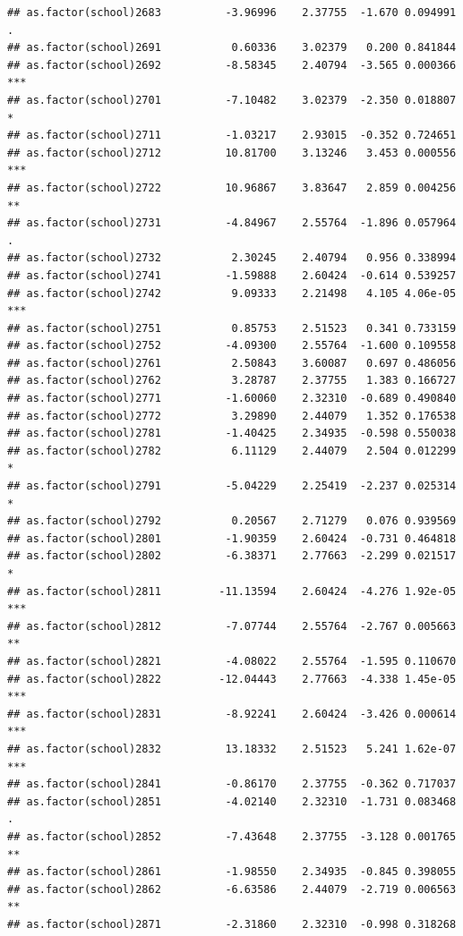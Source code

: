 \documentclass[ignorenonframetext,]{beamer}
\begin{document}
\begin{frame}[fragile]{}
\begin{verbatim}
## as.factor(school)2683          -3.96996    2.37755  -1.670 0.094991 .  
## as.factor(school)2691           0.60336    3.02379   0.200 0.841844    
## as.factor(school)2692          -8.58345    2.40794  -3.565 0.000366 ***
## as.factor(school)2701          -7.10482    3.02379  -2.350 0.018807 *  
## as.factor(school)2711          -1.03217    2.93015  -0.352 0.724651    
## as.factor(school)2712          10.81700    3.13246   3.453 0.000556 ***
## as.factor(school)2722          10.96867    3.83647   2.859 0.004256 ** 
## as.factor(school)2731          -4.84967    2.55764  -1.896 0.057964 .  
## as.factor(school)2732           2.30245    2.40794   0.956 0.338994    
## as.factor(school)2741          -1.59888    2.60424  -0.614 0.539257    
## as.factor(school)2742           9.09333    2.21498   4.105 4.06e-05 ***
## as.factor(school)2751           0.85753    2.51523   0.341 0.733159    
## as.factor(school)2752          -4.09300    2.55764  -1.600 0.109558    
## as.factor(school)2761           2.50843    3.60087   0.697 0.486056    
## as.factor(school)2762           3.28787    2.37755   1.383 0.166727    
## as.factor(school)2771          -1.60060    2.32310  -0.689 0.490840    
## as.factor(school)2772           3.29890    2.44079   1.352 0.176538    
## as.factor(school)2781          -1.40425    2.34935  -0.598 0.550038    
## as.factor(school)2782           6.11129    2.44079   2.504 0.012299 *  
## as.factor(school)2791          -5.04229    2.25419  -2.237 0.025314 *  
## as.factor(school)2792           0.20567    2.71279   0.076 0.939569    
## as.factor(school)2801          -1.90359    2.60424  -0.731 0.464818    
## as.factor(school)2802          -6.38371    2.77663  -2.299 0.021517 *  
## as.factor(school)2811         -11.13594    2.60424  -4.276 1.92e-05 ***
## as.factor(school)2812          -7.07744    2.55764  -2.767 0.005663 ** 
## as.factor(school)2821          -4.08022    2.55764  -1.595 0.110670    
## as.factor(school)2822         -12.04443    2.77663  -4.338 1.45e-05 ***
## as.factor(school)2831          -8.92241    2.60424  -3.426 0.000614 ***
## as.factor(school)2832          13.18332    2.51523   5.241 1.62e-07 ***
## as.factor(school)2841          -0.86170    2.37755  -0.362 0.717037    
## as.factor(school)2851          -4.02140    2.32310  -1.731 0.083468 .  
## as.factor(school)2852          -7.43648    2.37755  -3.128 0.001765 ** 
## as.factor(school)2861          -1.98550    2.34935  -0.845 0.398055    
## as.factor(school)2862          -6.63586    2.44079  -2.719 0.006563 ** 
## as.factor(school)2871          -2.31860    2.32310  -0.998 0.318268    

\end{verbatim}
\end{frame}
\end{document}
